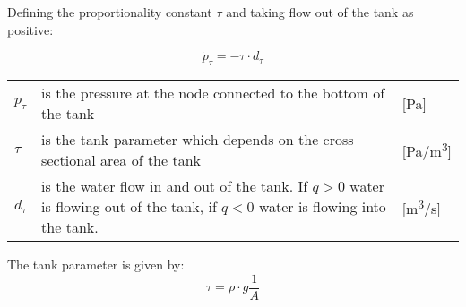 Defining the proportionality constant $\tau$ and taking flow out of the tank as positive:

\begin{equation} \label{eq:dpTank}
	\dot{p}_{\tau}=-\tau \cdot d_{\tau} 
\end{equation} 

\begin{center}
	\begin{tabular}{l p{10cm} l}
		$p_\tau$ & is the pressure at the node connected to the bottom of the tank & [\si{Pa}]\\
		$\tau$ & is the tank parameter which depends on the cross sectional area of the tank & [\si{Pa}/\si{m\cubed}]\\
		$d_\tau$ & is the water flow in and out of the tank. If $q > 0$ water is flowing out of the tank, if $q < 0$ water is flowing into the tank. & [\si{m\cubed}/\si{s}] 
		\end{tabular}
\end{center}

The tank parameter is given by:
\begin{equation}\label{eq:TankParameter}
\tau = \rho \cdot g \frac{1}{A}
\end{equation}
 
